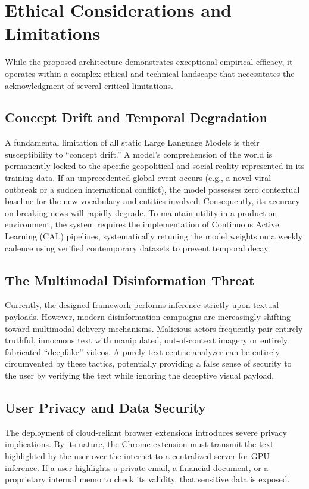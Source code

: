 \documentclass[conference]{IEEEtran}
\begin{document}
\section{Ethical Considerations and Limitations}

While the proposed architecture demonstrates exceptional empirical efficacy, it operates within a complex ethical and technical landscape that necessitates the acknowledgment of several critical limitations.

\subsection{Concept Drift and Temporal Degradation}
A fundamental limitation of all static Large Language Models is their susceptibility to ``concept drift.'' A model's comprehension of the world is permanently locked to the specific geopolitical and social reality represented in its training data. If an unprecedented global event occurs (e.g., a novel viral outbreak or a sudden international conflict), the model possesses zero contextual baseline for the new vocabulary and entities involved. Consequently, its accuracy on breaking news will rapidly degrade. To maintain utility in a production environment, the system requires the implementation of Continuous Active Learning (CAL) pipelines, systematically retuning the model weights on a weekly cadence using verified contemporary datasets to prevent temporal decay.

\subsection{The Multimodal Disinformation Threat}
Currently, the designed framework performs inference strictly upon textual payloads. However, modern disinformation campaigns are increasingly shifting toward multimodal delivery mechanisms. Malicious actors frequently pair entirely truthful, innocuous text with manipulated, out-of-context imagery or entirely fabricated ``deepfake'' videos. A purely text-centric analyzer can be entirely circumvented by these tactics, potentially providing a false sense of security to the user by verifying the text while ignoring the deceptive visual payload.

\subsection{User Privacy and Data Security}
The deployment of cloud-reliant browser extensions introduces severe privacy implications. By its nature, the Chrome extension must transmit the text highlighted by the user over the internet to a centralized server for GPU inference. If a user highlights a private email, a financial document, or a proprietary internal memo to check its validity, that sensitive data is exposed. 
\end{document}
